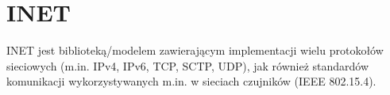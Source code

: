 \section{INET}
INET jest biblioteką/modelem zawierającym implementacji wielu protokołów sieciowych (m.in. IPv4, IPv6, TCP, SCTP, UDP), jak również standardów komunikacji wykorzystywanych m.in. w sieciach czujników (IEEE 802.15.4).\cite{inet}

